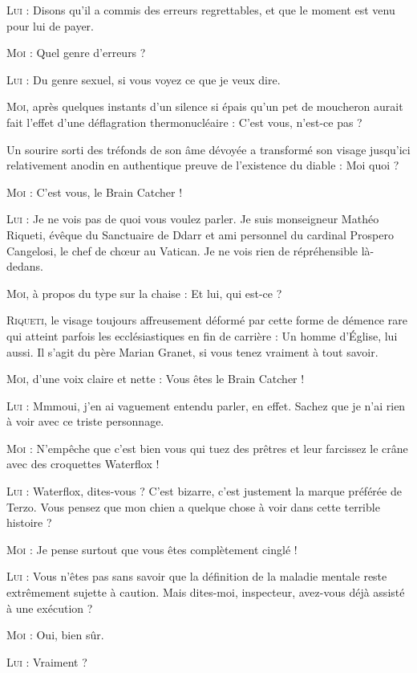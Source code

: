 \begin{dialogue}
\textsc{Lui} : Disons qu’il a commis des erreurs regrettables, et que le moment est venu pour lui de payer.

\textsc{Moi} : Quel genre d’erreurs ?

\textsc{Lui} : Du genre sexuel, si vous voyez ce que je veux dire.

\textsc{Moi}, après quelques instants d’un silence si épais qu’un pet de moucheron aurait fait l’effet d’une déflagration thermonucléaire : C’est vous, n’est-ce pas ?

Un sourire sorti des tréfonds de son âme dévoyée a transformé son visage jusqu’ici relativement anodin en authentique preuve de l’existence du diable : Moi quoi ?

\textsc{Moi} : C’est vous, le Brain Catcher !

\textsc{Lui} : Je ne vois pas de quoi vous voulez parler. Je suis monseigneur Mathéo Riqueti, évêque du Sanctuaire de Ddarr et ami personnel du cardinal Prospero Cangelosi, le chef de chœur au Vatican. Je ne vois rien de répréhensible là-dedans.

\textsc{Moi}, à propos du type sur la chaise : Et lui, qui est-ce ?

\textsc{Riqueti}, le visage toujours affreusement déformé par cette forme de démence rare qui atteint parfois les ecclésiastiques en fin de carrière : Un homme d’Église, lui aussi. Il s’agit du père Marian Granet, si vous tenez vraiment à tout savoir.

\textsc{Moi}, d’une voix claire et nette : Vous êtes le Brain Catcher !

\textsc{Lui} : Mmmoui, j’en ai vaguement entendu parler, en effet. Sachez que je n’ai rien à voir avec ce triste personnage.

\textsc{Moi} : N’empêche que c’est bien vous qui tuez des prêtres et leur farcissez le crâne avec des croquettes Waterflox !

\textsc{Lui} : Waterflox, dites-vous ? C’est bizarre, c’est justement la marque préférée de Terzo. Vous pensez que mon chien a quelque chose à voir dans cette terrible histoire ?

\textsc{Moi} : Je pense surtout que vous êtes complètement cinglé !

\textsc{Lui} : Vous n’êtes pas sans savoir que la définition de la maladie mentale reste extrêmement sujette à caution. Mais dites-moi, inspecteur, avez-vous déjà assisté à une exécution ?

\textsc{Moi} : Oui, bien sûr.

\textsc{Lui} : Vraiment ?


\end{dialogue}
